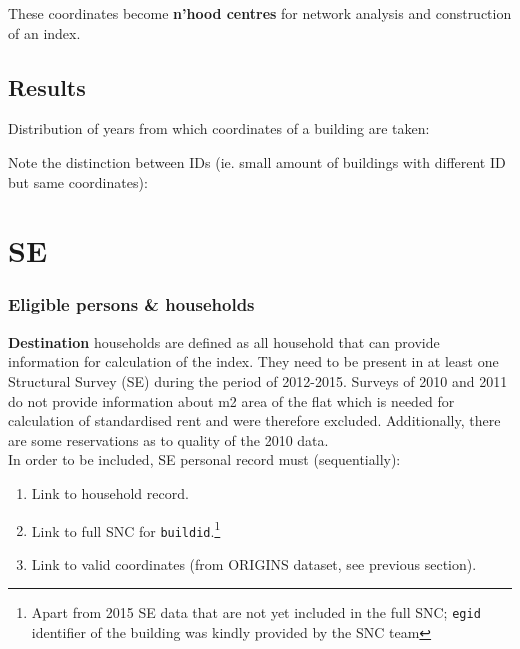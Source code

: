 \documentclass[a4paper, notitlepage, fleqn]{article} %
\begin{document}
These coordinates become \textbf{n'hood centres} for network analysis and construction of an index.  

\subsection{Results}

Distribution of years from which coordinates of a building are taken: 
\begin{stlog}\end{stlog}
Note the distinction between IDs (ie. small amount of buildings with different ID but same coordinates):
\begin{stlog}\end{stlog}
\newpage
\section{SE}

\subsubsection{Eligible persons \& households}

\textbf{Destination} households are defined as all household that can provide information for calculation of the index. 
They need to be present in at least one Structural Survey (SE) during the period of 2012-2015.
Surveys of 2010 and 2011 do not provide information
about m2 area of the flat which is needed for calculation of standardised rent and were therefore excluded. 
Additionally, there are some reservations as to quality of the 2010 data. \\

In order to be included, SE personal record must (sequentially): 

\begin{enumerate}

	\item Link to household record.
	
	\item Link to full SNC for \texttt{buildid}.\footnote{Apart from 2015 SE data that are not yet included in the full SNC; \texttt{egid} identifier of the building was kindly provided by the SNC team}
	
	\item Link to valid coordinates (from ORIGINS dataset, see previous section).

\end{enumerate}
\end{document}
